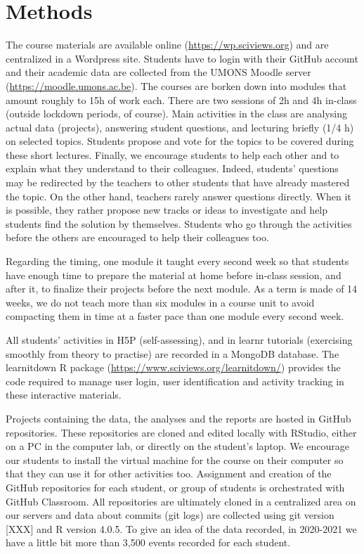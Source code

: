 \documentclass{aims}
\theoremstyle{definition}
\begin{document}
\hypertarget{methods}{%
\section{Methods}\label{methods}}

The course materials are available online
(\url{https://wp.sciviews.org}) and are centralized in a Wordpress site.
Students have to login with their GitHub account and their academic data
are collected from the UMONS Moodle server
(\url{https://moodle.umons.ac.be}). The courses are borken down into
modules that amount roughly to 15h of work each. There are two sessions
of 2h and 4h in-class (outside lockdown periods, of course). Main
activities in the class are analysing actual data (projects), answering
student questions, and lecturing briefly (1/4 h) on selected topics.
Students propose and vote for the topics to be covered during these
short lectures. Finally, we encourage students to help each other and to
explain what they understand to their colleagues. Indeed, students'
questions may be redirected by the teachers to other students that have
already mastered the topic. On the other hand, teachers rarely answer
questions directly. When it is possible, they rather propose new tracks
or ideas to investigate and help students find the solution by
themselves. Students who go through the activities before the others are
encouraged to help their colleagues too.

Regarding the timing, one module it taught every second week so that
students have enough time to prepare the material at home before
in-class session, and after it, to finalize their projects before the
next module. As a term is made of 14 weeks, we do not teach more than
six modules in a course unit to avoid compacting them in time at a
faster pace than one module every second week.

All students' activities in H5P (self-assessing), and in learnr
tutorials (exercising smoothly from theory to practise) are recorded in
a MongoDB database. The learnitdown R package
(\url{https://www.sciviews.org/learnitdown/}) provides the code required
to manage user login, user identification and activity tracking in these
interactive materials.

Projects containing the data, the analyses and the reports are hosted in
GitHub repositories. These repositories are cloned and edited locally
with RStudio, either on a PC in the computer lab, or directly on the
student's laptop. We encourage our students to install the virtual
machine for the course on their computer so that they can use it for
other activities too. Assignment and creation of the GitHub repositories
for each student, or group of students is orchestrated with GitHub
Classroom. All repositories are ultimately cloned in a centralized area
on our servers and data about commits (git logs) are collected using git
version {[}XXX{]} and R version 4.0.5. To give an idea of the data
recorded, in 2020-2021 we have a little bit more than 3,500 events
recorded for each student.
\end{document}
